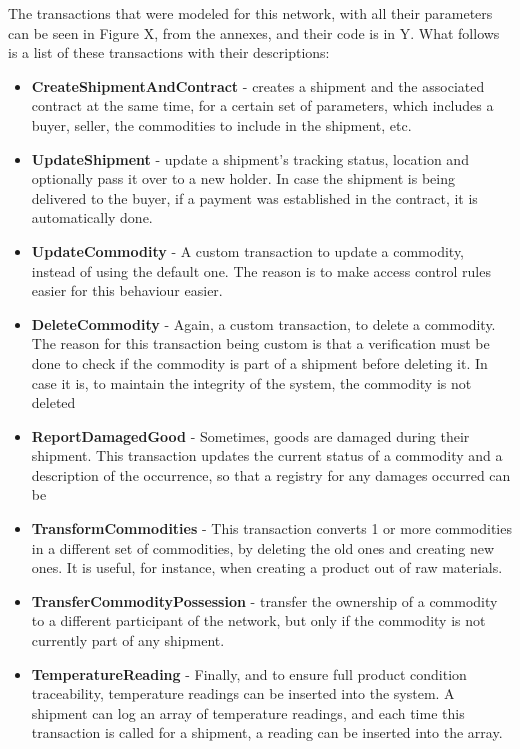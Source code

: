 The transactions that were modeled for this network, with all their parameters can be seen in Figure X, from the annexes, and their code is in Y. What follows is a list of these transactions with their descriptions:
\begin{itemize}
    \item \textbf{CreateShipmentAndContract} - creates a shipment and the associated contract at the same time, for a certain set of parameters, which includes a buyer, seller, the commodities to include in the shipment, etc.
    \item \textbf{UpdateShipment} - update a shipment's tracking status, location and optionally pass it over to a new holder. In case the shipment is being delivered to the buyer, if a payment was established in the contract, it is automatically done. 
    \item \textbf{UpdateCommodity} - A custom transaction to update a commodity, instead of using the default one. The reason is to make access control rules easier for this behaviour easier.
    \item \textbf{DeleteCommodity} - Again, a custom transaction, to delete a commodity. The reason for this transaction being custom is that a verification must be done to check if the commodity is part of a shipment before deleting it. In case it is, to maintain the integrity of the system, the commodity is not deleted
    \item \textbf{ReportDamagedGood} - Sometimes, goods are damaged during their shipment. This transaction updates the current status of a commodity and a description of the occurrence, so that a registry for any damages occurred can be
    \item \textbf{TransformCommodities} - This transaction converts 1 or more commodities in a different set of commodities, by deleting the old ones and creating new ones. It is useful, for instance, when creating a product out of raw materials. 
    \item \textbf{TransferCommodityPossession} - transfer the ownership of a commodity to a different participant of the network, but only if the commodity is not currently part of any shipment.
    \item \textbf{TemperatureReading} - Finally, and to ensure full product condition traceability, temperature readings can be inserted into the system. A shipment can log an array of temperature readings, and each time this transaction is called for a shipment, a reading can be inserted into the array.
\end{itemize}

